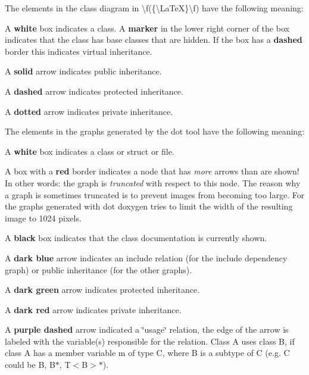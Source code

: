 The elements in the class diagram in \textbackslash{}f(\{\textbackslash{}\+La\+TeX\}\textbackslash{}f) have the following meaning\+: 
\begin{DoxyItemize}
\item A {\bfseries{white}} box indicates a class. A {\bfseries{marker}} in the lower right corner of the box indicates that the class has base classes that are hidden. If the box has a {\bfseries{dashed}} border this indicates virtual inheritance. 
\item A {\bfseries{solid}} arrow indicates public inheritance. 
\item A {\bfseries{dashed}} arrow indicates protected inheritance. 
\item A {\bfseries{dotted}} arrow indicates private inheritance. 
\end{DoxyItemize}

The elements in the graphs generated by the dot tool have the following meaning\+: 
\begin{DoxyItemize}
\item A {\bfseries{white}} box indicates a class or struct or file. 
\item A box with a {\bfseries{red}} border indicates a node that has {\itshape more} arrows than are shown! In other words\+: the graph is {\itshape truncated} with respect to this node. The reason why a graph is sometimes truncated is to prevent images from becoming too large. For the graphs generated with dot doxygen tries to limit the width of the resulting image to 1024 pixels. ~\newline
 
\item A {\bfseries{black}} box indicates that the class\textquotesingle{} documentation is currently shown. 
\item A {\bfseries{dark blue}} arrow indicates an include relation (for the include dependency graph) or public inheritance (for the other graphs). 
\item A {\bfseries{dark green}} arrow indicates protected inheritance. 
\item A {\bfseries{dark red}} arrow indicates private inheritance. 
\item A {\bfseries{purple dashed}} arrow indicated a \char`\"{}usage\char`\"{} relation, the edge of the arrow is labeled with the variable(s) responsible for the relation. Class {\ttfamily A} uses class {\ttfamily B}, if class {\ttfamily A} has a member variable {\ttfamily m} of type C, where B is a subtype of C (e.\+g. {\ttfamily C} could be {\ttfamily B}, {\ttfamily B$\ast$}, {\ttfamily T$<$B$>$$\ast$}). 
\end{DoxyItemize}

